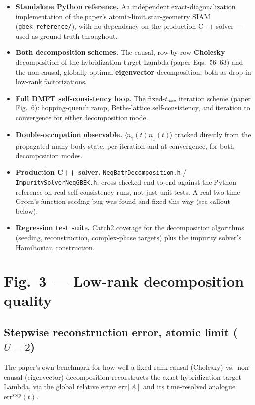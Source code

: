 \documentclass[11pt]{article}
\begin{document}
\begin{itemize}
  \item \textbf{Standalone Python reference.} An independent
    exact-diagonalization implementation of the paper's atomic-limit
    star-geometry SIAM (\texttt{gbek\_reference/}), with no dependency on
    the production C++ solver --- used as ground truth throughout.
  \item \textbf{Both decomposition schemes.} The causal, row-by-row
    \textbf{Cholesky} decomposition of the hybridization target Lambda (paper Eqs.\
    56--63) and the non-causal, globally-optimal \textbf{eigenvector}
    decomposition, both as drop-in low-rank factorizations.
  \item \textbf{Full DMFT self-consistency loop.} The fixed-$t_\text{max}$
    iteration scheme (paper Fig.\ 6): hopping-quench ramp, Bethe-lattice
    self-consistency, and iteration to convergence for either
    decomposition mode.
  \item \textbf{Double-occupation observable.} $\langle n_\uparrow(t)
    n_\downarrow(t)\rangle$ tracked directly from the propagated
    many-body state, per-iteration and at convergence, for both
    decomposition modes.
  \item \textbf{Production C++ solver.} \texttt{NeqBathDecomposition.h} /
    \texttt{ImpuritySolverNeqGBEK.h}, cross-checked end-to-end against the
    Python reference on real self-consistency runs, not just unit tests.
    A real two-time Green's-function seeding bug was found and fixed this
    way (see callout below).
  \item \textbf{Regression test suite.} Catch2 coverage for the
    decomposition algorithms (seeding, reconstruction, complex-phase
    targets) plus the impurity solver's Hamiltonian construction.
\end{itemize}

\section{Fig.\ 3 --- Low-rank decomposition quality}
\subsection*{Stepwise reconstruction error, atomic limit ($U=2$)}
The paper's own benchmark for how well a fixed-rank causal (Cholesky) vs.\
non-causal (eigenvector) decomposition reconstructs the exact hybridization target Lambda,
via the global relative error $\mathrm{err}[A]$ and its time-resolved
analogue $\mathrm{err}^\mathrm{step}(t)$.
\end{document}
